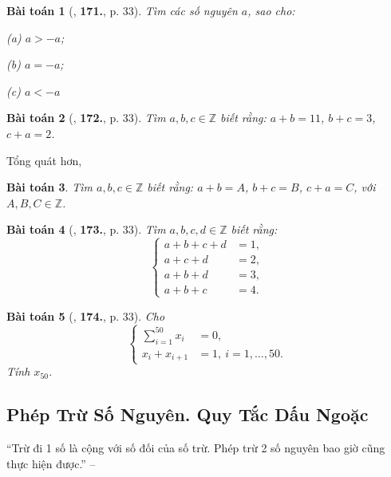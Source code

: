 \documentclass{article}
\numberwithin{equation}{section}
\newtheorem{baitoan}{Bài toán}[section]
\begin{document}
\begin{baitoan}[\cite{Binh_Toan_6_tap_1}, \textbf{171.}, p. 33]
	Tìm các số nguyên $a$, sao cho:
	\begin{enumerate*}
		\item[(a)] $a > -a$;
		\item[(b)] $a = -a$;
		\item[(c)] $a < -a$
	\end{enumerate*}
\end{baitoan}

\begin{baitoan}[\cite{Binh_Toan_6_tap_1}, \textbf{172.}, p. 33]
	Tìm $a,b,c\in\mathbb{Z}$ biết rằng: $a + b = 11$, $b + c = 3$, $c + a = 2$.
\end{baitoan}
Tổng quát hơn,
\begin{baitoan}
	Tìm $a,b,c\in\mathbb{Z}$ biết rằng: $a + b = A$, $b + c = B$, $c + a = C$, với $A,B,C\in\mathbb{Z}$.
\end{baitoan}

\begin{baitoan}[\cite{Binh_Toan_6_tap_1}, \textbf{173.}, p. 33]
	Tìm $a,b,c,d\in\mathbb{Z}$ biết rằng:
	\begin{equation*}
		\left\{\begin{split}
			a + b + c + d &= 1,\\
			a + c + d &= 2,\\
			a + b + d &= 3,\\
			a + b + c &= 4.
		\end{split}\right.		
	\end{equation*}
\end{baitoan}

\begin{baitoan}[\cite{Binh_Toan_6_tap_1}, \textbf{174.}, p. 33]
	Cho
	\begin{equation*}
		\left\{\begin{split}
			\sum_{i=1}^{50} x_i &= 0,\\
			x_i + x_{i+1} &= 1,\ i = 1,\ldots,50.
		\end{split}\right.		
	\end{equation*}
	Tính $x_{50}$.
\end{baitoan}

\subsection{Phép Trừ Số Nguyên. Quy Tắc Dấu Ngoặc}
``Trừ đi 1 số là cộng với số đối của số trừ. Phép trừ 2 số nguyên bao giờ cũng thực hiện được.'' -- \cite[p. 32]{Binh_Toan_6_tap_1}
\end{document}
